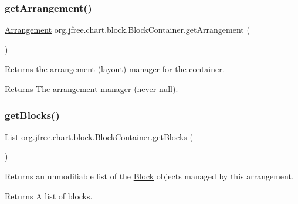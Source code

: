 \subsubsection{\texorpdfstring{get\+Arrangement()}{getArrangement()}}
{\footnotesize\ttfamily \mbox{\hyperlink{interfaceorg_1_1jfree_1_1chart_1_1block_1_1_arrangement}{Arrangement}} org.\+jfree.\+chart.\+block.\+Block\+Container.\+get\+Arrangement (\begin{DoxyParamCaption}{ }\end{DoxyParamCaption})}

Returns the arrangement (layout) manager for the container.

\begin{DoxyReturn}{Returns}
The arrangement manager (never {\ttfamily null}). 
\end{DoxyReturn}
\mbox{\label{classorg_1_1jfree_1_1chart_1_1block_1_1_block_container_a3e0c3b6c32ebec8932603a24776e4faa}} 
\subsubsection{\texorpdfstring{get\+Blocks()}{getBlocks()}}
{\footnotesize\ttfamily List org.\+jfree.\+chart.\+block.\+Block\+Container.\+get\+Blocks (\begin{DoxyParamCaption}{ }\end{DoxyParamCaption})}

Returns an unmodifiable list of the \mbox{\hyperlink{interfaceorg_1_1jfree_1_1chart_1_1block_1_1_block}{Block}} objects managed by this arrangement.

\begin{DoxyReturn}{Returns}
A list of blocks. 
\end{DoxyReturn}
\mbox{\label{classorg_1_1jfree_1_1chart_1_1block_1_1_block_container_a3fe33aa07a2a666d08c20085c8c2b579}} 
